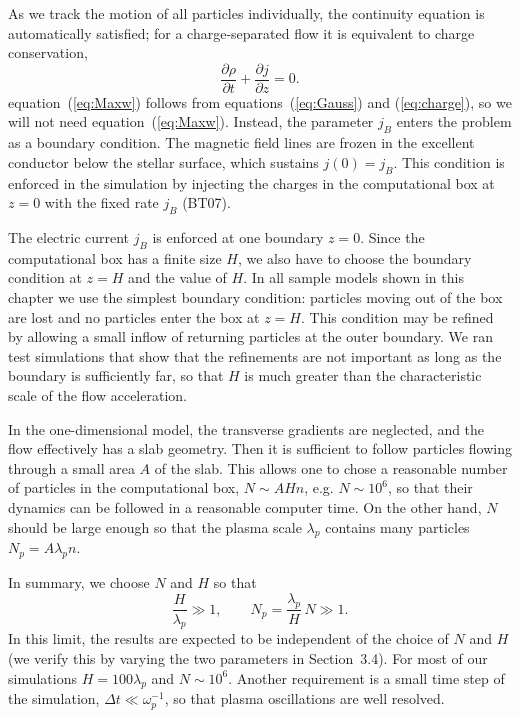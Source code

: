 As we track the motion of all particles individually, the continuity equation is
automatically satisfied; for a charge-separated flow it is equivalent to charge
conservation,
\begin{equation}
\label{eq:charge}
    \frac{\partial\rho}{\partial t}+\frac{\partial j}{\partial z}=0.
\end{equation}
equation~(\ref{eq:Maxw}) follows from equations~(\ref{eq:Gauss}) and (\ref{eq:charge}),
so we will not need equation~(\ref{eq:Maxw}).
Instead, the parameter $j_B$ enters the problem as a boundary condition.
The magnetic field lines are frozen in the excellent conductor below the stellar
surface, which sustains $j(0)=j_B$.
This condition is enforced in the simulation by injecting the charges in
the computational box at $z=0$ with the fixed rate $j_B$ (BT07).

The electric current $j_B$ is enforced at one boundary $z=0$. Since
the computational box has a finite size $H$, we also have to choose the
boundary condition at $z=H$ and the value of $H$. In all sample models
shown in this chapter we use the simplest boundary condition:
particles moving out of the box are lost and no particles enter the box at
$z=H$. This condition may be refined by allowing a small inflow of returning
particles at the outer boundary. We ran test simulations that show that the
refinements are not important as long as the boundary is sufficiently far,
so that $H$ is much greater than the characteristic scale of the flow acceleration.

In the one-dimensional model, the transverse
gradients are neglected, and the flow effectively has a slab geometry.
Then it is sufficient to follow particles flowing through a small area $A$ of the slab.
This allows one to chose a reasonable number of particles in the computational
box, $N\sim AHn$, e.g. $N\sim 10^6$, so that their dynamics can be followed
in a reasonable computer time. On the other hand,
$N$ should be large enough so that the plasma scale $\lambda_p$ contains
many particles $N_p=A\lambda_p n$.

In summary, we choose $N$ and $H$ so that
\begin{equation}
    \frac{H}{\lambda_p}\gg 1, \qquad N_p=\frac{\lambda_p}{H}\,N \gg 1.
\end{equation}
In this limit, the results are expected to be independent of the choice of $N$ and
$H$ (we verify this by varying the two parameters in Section~3.4). For most of our
simulations $H=100\lambda_p$ and $N\sim 10^6$. Another requirement is a small
time step of the simulation, $\Delta t\ll\omega_p^{-1}$, so that plasma oscillations
are well resolved.


